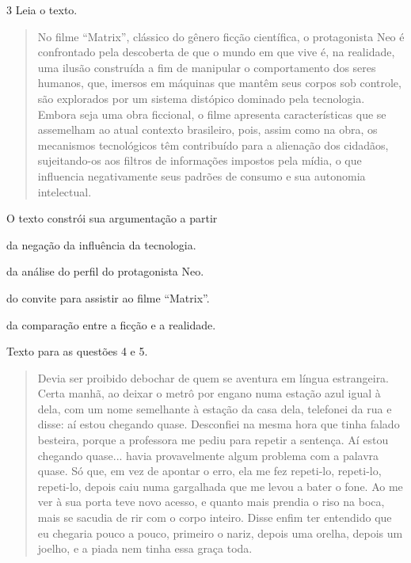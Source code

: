 \num{3} Leia o texto.

\begin{quote}
No filme ``Matrix'', clássico do gênero ficção científica, o
protagonista Neo é confrontado pela descoberta de que o mundo em que
vive é, na realidade, uma ilusão construída a fim de manipular o
comportamento dos seres humanos, que, imersos em máquinas que mantêm
seus corpos sob controle, são explorados por um sistema distópico
dominado pela tecnologia. Embora seja uma obra ficcional, o filme
apresenta características que se assemelham ao atual contexto
brasileiro, pois, assim como na obra, os mecanismos tecnológicos têm
contribuído para a alienação dos cidadãos, sujeitando-os aos filtros de
informações impostos pela mídia, o que influencia negativamente seus
padrões de consumo e sua autonomia intelectual.

\end{quote}

O texto constrói sua argumentação a partir

\begin{escolha}
\item da negação da influência da tecnologia.

\item da análise do perfil do protagonista Neo.

\item do convite para assistir ao filme ``Matrix''.

\item da comparação entre a ficção e a realidade.
\end{escolha}

Texto para as questões 4 e 5.

\begin{quote}
Devia ser proibido debochar de quem se aventura em língua estrangeira.
Certa manhã, ao deixar o metrô por engano numa estação azul igual à
dela, com um nome semelhante à estação da casa dela, telefonei da rua e
disse: aí estou chegando quase. Desconfiei na mesma hora que tinha
falado besteira, porque a professora me pediu para repetir a sentença.
Aí estou chegando quase... havia provavelmente algum problema com a
palavra quase. Só que, em vez de apontar o erro, ela me fez repeti-lo,
repeti-lo, repeti-lo, depois caiu numa gargalhada que me levou a bater o
fone. Ao me ver à sua porta teve novo acesso, e quanto mais prendia o
riso na boca, mais se sacudia de rir com o corpo inteiro. Disse enfim
ter entendido que eu chegaria pouco a pouco, primeiro o nariz, depois
uma orelha, depois um joelho, e a piada nem tinha essa graça toda.
\end{quote}

